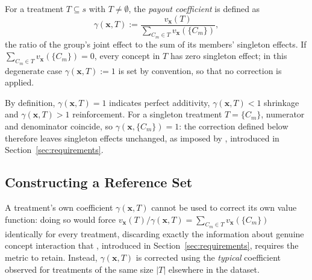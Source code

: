 For a treatment $T \subseteq s$ with $T \neq \emptyset$, the \emph{payout coefficient} is defined as
\begin{equation}
	\label{eq:payout_coefficient}
	\gamma(\mathbf{x},T) := \frac{v_{\mathbf{x}}(T)}{\displaystyle\sum_{C_m \in T} v_{\mathbf{x}}(\{C_m\})},
\end{equation}
the ratio of the group's joint effect to the sum of its members' singleton effects. If $\sum_{C_m\in T} v_{\mathbf{x}}(\{C_m\})=0$, every concept in $T$ has zero singleton effect; in this degenerate case $\gamma(\mathbf{x},T):=1$ is set by convention, so that no correction is applied.

By definition, $\gamma(\mathbf{x},T)=1$ indicates perfect additivity, $\gamma(\mathbf{x},T)<1$ shrinkage and $\gamma(\mathbf{x},T)>1$ reinforcement. For a singleton treatment $T=\{C_m\}$, numerator and denominator coincide, so $\gamma(\mathbf{x},\{C_m\}) = 1$: the correction defined below therefore leaves singleton effects unchanged, as imposed by , introduced in Section~\ref{sec:requirements}.

\subsection{Constructing a Reference Set}
\label{sec:reference_set}

A treatment's own coefficient $\gamma(\mathbf{x},T)$ cannot be used to correct its own value function: doing so would force $v_{\mathbf{x}}(T)/\gamma(\mathbf{x},T) = \sum_{C_m\in T} v_{\mathbf{x}}(\{C_m\})$ identically for every treatment, discarding exactly the information about genuine concept interaction that , introduced in Section~\ref{sec:requirements}, requires the metric to retain. Instead, $\gamma(\mathbf{x},T)$ is corrected using the \emph{typical} coefficient observed for treatments of the same size $|T|$ elsewhere in the dataset.

